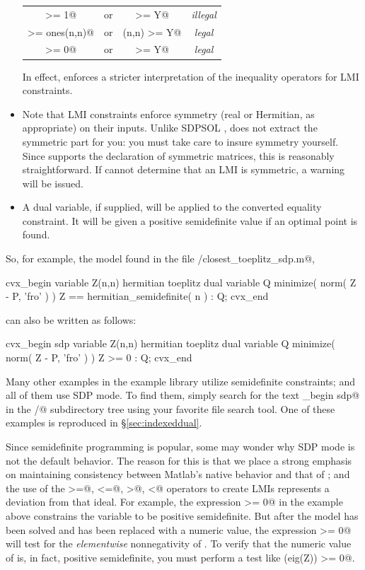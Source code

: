 \documentclass[12pt]{article}
\begin{document}
\begin{itemize}
      \begin{center}
      \begin{tabular}{cccc}
      	\verb@X >= 1@ & or & \verb@1 >= Y@ & \emph{illegal} \\
      	\verb@X >= ones(n,n)@ & or & \verb@ones(n,n) >= Y@ & \emph{legal} \\
      	\verb@X >= 0@ & or & \verb@0 >= Y@ & \emph{legal} \\
      \end{tabular}
      \end{center}
      In effect, \cvx enforces a stricter interpretation of the inequality
      operators for LMI constraints.
\item Note that LMI constraints enforce symmetry (real or Hermitian, as
      appropriate) on their inputs. Unlike SDPSOL \cite{SDPSOL}, \cvx 
      does not extract the symmetric part for you: you must take
      care to insure symmetry yourself. Since \cvx supports the declaration
      of symmetric matrices, this is reasonably straightforward. If \cvx cannot
      determine that an LMI is symmetric, a warning will be issued.      
\item A dual variable, if supplied, will be applied to the converted
      equality constraint. It will be given a 
      positive semidefinite value if an optimal point is found.
\end{itemize}
So, for example, the \cvx model found in the file
\verb@examples/closest_toeplitz_sdp.m@,
\begin{code}
cvx_begin
    variable Z(n,n) hermitian toeplitz
    dual variable Q
    minimize( norm( Z - P, 'fro' ) )
    Z == hermitian_semidefinite( n ) : Q;
cvx_end
\end{code}
can also be written as follows:
\begin{code}
cvx_begin sdp
    variable Z(n,n) hermitian toeplitz
    dual variable Q
    minimize( norm( Z - P, 'fro' ) )
    Z >= 0 : Q;
cvx_end
\end{code}
Many other examples in the \cvx example library utilize semidefinite
constraints; and all of them use SDP mode. To find them, simply 
search for the text \verb@cvx_begin sdp@ in the \verb@examples/@
subdirectory tree using your favorite file search tool. One
of these examples is reproduced in \S\ref{sec:indexeddual}.

Since semidefinite programming is popular, some
may wonder why SDP mode is not the default behavior.
The reason for this is that we place a
strong emphasis on maintaining consistency between Matlab's native
behavior and that of \cvx; and 
the use of the \verb@>=@, \verb@<=@, \verb@>@, \verb@<@
operators to create LMIs
represents a deviation from that ideal.
For example, the expression \verb@Z >= 0@ in the example above constrains
the variable \verb@Z@ to be positive semidefinite. But after the model has been solved
and \verb@Z@ has been replaced with a numeric value,
the expression \verb@Z >= 0@ will test for the \emph{elementwise}
nonnegativity of \verb@Z@. To verify that the numeric value
of \verb@Z@ is, in fact, positive semidefinite, you must perform
a test like \verb@min(eig(Z)) >= 0@.
\end{document}
